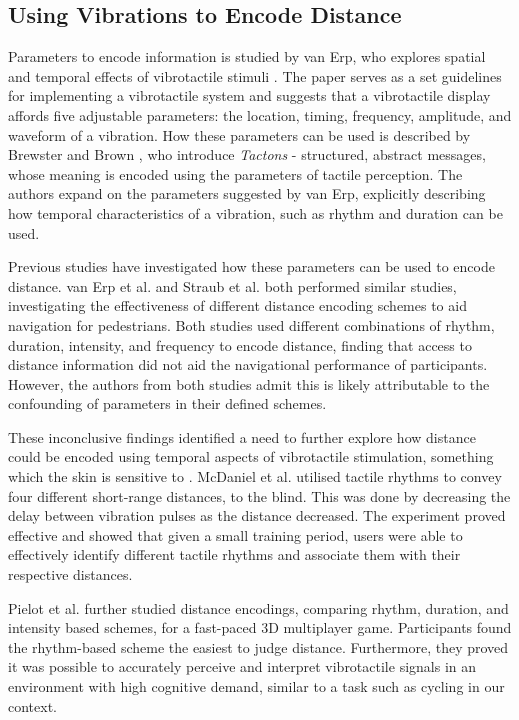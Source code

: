 \documentclass{mpaper}
\begin{document}
\subsection{Using Vibrations to Encode Distance}
Parameters to encode information is studied by van Erp, who explores spatial and temporal effects of vibrotactile stimuli \cite{guidelines}. The paper serves as a set guidelines for implementing a vibrotactile system and suggests that a vibrotactile display affords five adjustable parameters: the location, timing, frequency, amplitude, and waveform of a vibration. How these parameters can be used is described by Brewster and Brown \cite{10.5555/976310.976313}, who introduce \textit{Tactons} - structured, abstract messages, whose meaning is encoded using the parameters of tactile perception. The authors expand on the parameters suggested by van Erp, explicitly describing how temporal characteristics of a vibration, such as rhythm and duration can be used.

Previous studies have investigated how these parameters can be used to encode distance. van Erp et al. \cite{10.1145/1060581.1060585} and Straub et al. \cite{5326374} both performed similar studies, investigating the effectiveness of different distance encoding schemes to aid navigation for pedestrians. Both studies used different combinations of rhythm, duration, intensity, and frequency to encode distance, finding that access to distance information did not aid the navigational performance of participants. However, the authors from both studies admit this is likely attributable to the confounding of parameters in their defined schemes.

These inconclusive findings identified a need to further explore how distance could be encoded using temporal aspects of vibrotactile stimulation, something which the skin is sensitive to \cite{doi:10.1068/p5014}. McDaniel et al. \cite{10.1145/1520340.1520718} utilised tactile rhythms to convey four different short-range distances, to the blind. This was done by decreasing the delay between vibration pulses as the distance decreased. The experiment proved effective and showed that given a small training period, users were able to effectively identify different tactile rhythms and associate them with their respective distances.

Pielot et al. \cite{10.1145/1753326.1753581} further studied distance encodings, comparing rhythm, duration, and intensity based schemes, for a fast-paced 3D multiplayer game. Participants found the rhythm-based scheme the easiest to judge distance. Furthermore, they proved it was possible to accurately perceive and interpret vibrotactile signals in an environment with high cognitive demand, similar to a task such as cycling in our context.
\end{document}
